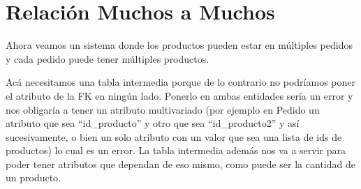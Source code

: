 \documentclass[12pt]{article}
\begin{document}
\section{Relación Muchos a Muchos}
Ahora veamos un sistema donde los productos pueden estar en múltiples pedidos y cada pedido puede tener múltiples productos.

\begin{center}
\end{center}

Acá necesitamos una tabla intermedia porque de lo contrario no podríamos poner el atributo de la FK en ningún lado. Ponerlo en ambas entidades sería un error y nos obligaría a tener un atributo multivariado (por ejemplo en Pedido un atributo que sea ``id\_producto'' y otro que sea ``id\_producto2'' y así sucesivamente, o bien un solo atributo con un valor que sea una lista de ids de productos) lo cual es un error. La tabla intermedia además nos va a servir para poder tener atributos que dependan de eso mismo, como puede ser la cantidad de un producto.
\end{document}
